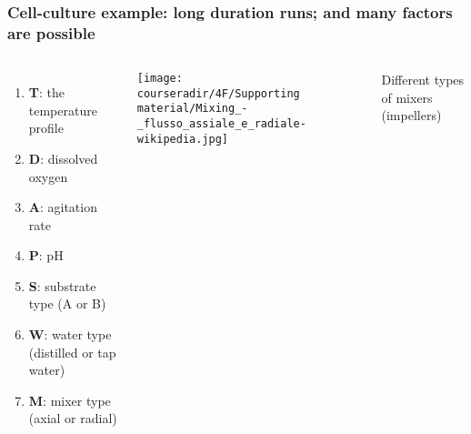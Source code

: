 \documentclass[11pt,aspectratio=169,mathserif]{beamer}
\begin{document}
\begin{frame}\frametitle{Cell-culture example: long duration runs; and many factors are possible}
	\begin{columns}[c]
			\begin{enumerate}
				\item	\textbf{T}: the temperature profile
				\item	\textbf{D}: dissolved oxygen
				\item	\textbf{A}: agitation rate
				\item	\textbf{P}: pH
				\item	\textbf{S}: substrate type (A or B)
				\item	\textbf{W}: water type (distilled or tap water)
				\item	\textbf{M}: mixer type (axial or radial)
		
			\end{enumerate}
		
			
			
			\vspace{0.2cm}
			
			\centerline{\texttt{[image: \\courseradir/4F/Supporting material/Mixing\_-\_flusso\_assiale\_e\_radiale-wikipedia.jpg]}}
			
			{\color{blue} \small Different types of mixers (impellers)} 
	\end{columns}
\end{frame}
\end{document}
